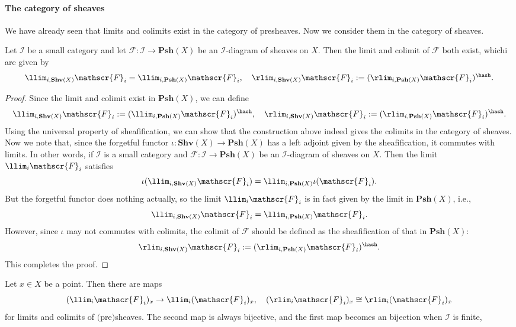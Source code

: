 \paragraph{The category of sheaves}
We have already seen that limits and colimits exist in the category of presheaves. Now we consider them in the category of sheaves.
\begin{proposition}
Let $\mathcal{I}$ be a small category and let $\mathscr{F}:\mathcal{I}\to\mathbf{Psh}(X)$ be an $\mathcal{I}$-diagram of sheaves on $X$. Then the limit and colimit of $\mathscr{F}$ both exist, whichi are given by
\[\llim_{i,\mathbf{Shv}(X)}\mathscr{F}_i=\llim_{i,\mathbf{Psh}(X)}\mathscr{F}_i,\quad \rlim_{i,\mathbf{Shv}(X)}\mathscr{F}_i:=(\rlim_{i,\mathbf{Psh}(X)}\mathscr{F}_i)^{\hash}.\]
\end{proposition}
\begin{proof}
Since the limit and colimit exist in $\mathbf{Psh}(X)$, we can define
\[\llim_{i,\mathbf{Shv}(X)}\mathscr{F}_i:=(\llim_{i,\mathbf{Psh}(X)}\mathscr{F}_i)^{\hash},\quad \rlim_{i,\mathbf{Shv}(X)}\mathscr{F}_i:=(\rlim_{i,\mathbf{Psh}(X)}\mathscr{F}_i)^{\hash}.\]
Using the universal property of sheafification, we can show that the construction above indeed gives the colimits in the category of sheaves. Now we note that, since the forgetful functor $\iota:\mathbf{Shv}(X)\to\mathbf{Psh}(X)$ has a left adjoint given by the sheafification, it commutes with limits. In other words, if $\mathcal{I}$ is a small category and $\mathscr{F}:\mathcal{I}\to\mathbf{Psh}(X)$ be an $\mathcal{I}$-diagram of sheaves on $X$. Then the limit $\llim_i\mathscr{F}_i$ satisfies
\[\iota(\llim_{i,\mathbf{Shv}(X)}\mathscr{F}_i)=\llim_{i,\mathbf{Psh}(X)}\iota(\mathscr{F}_i).\]
But the forgetful functor does nothing actually, so the limit $\llim_i\mathscr{F}_i$ is in fact given by the limit in $\mathbf{Psh}(X)$, i.e.,
\[\llim_{i,\mathbf{Shv}(X)}\mathscr{F}_i=\llim_{i,\mathbf{Psh}(X)}\mathscr{F}_i.\]
However, since $\iota$ may not commutes with colimits, the colimit of $\mathscr{F}$ should be defined as the sheafification of that in $\mathbf{Psh}(X)$:
\[\rlim_{i,\mathbf{Shv}(X)}\mathscr{F}_i:=(\rlim_{i,\mathbf{Psh}(X)}\mathscr{F}_i)^{\hash}.\]
This completes the proof.
\end{proof}
\begin{proposition}
Let $x\in X$ be a point. Then there are maps
\[(\llim_i\mathscr{F}_i)_x\to\llim_i(\mathscr{F}_i)_x,\quad (\rlim_i\mathscr{F}_i)_x\cong\rlim_i(\mathscr{F}_i)_x\]
for limits and colimits of $($pre$)$sheaves. The second map is always bijective, and the first map becomes an bijection when $\mathcal{I}$ is finite,
\end{proposition}
